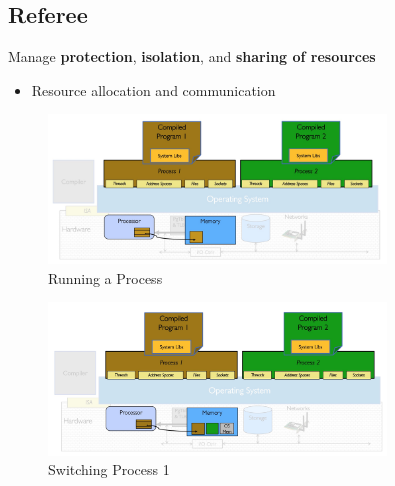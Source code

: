\subsection{Referee}
Manage \textbf{protection}, \textbf{isolation}, and \textbf{sharing of resources}
\begin{itemize}
    \item Resource allocation and communication
\end{itemize}
\begin{figure}[H]
    \centering
    \includegraphics[width = 0.8\textwidth ]{figures/running_process.jpg}
    \caption{Running a Process}
\end{figure}

\begin{figure}[H]
    \centering
    \includegraphics[width = 0.8\textwidth ]{figures/switching_process.jpg}
    \caption{Switching Process 1}
\end{figure}
